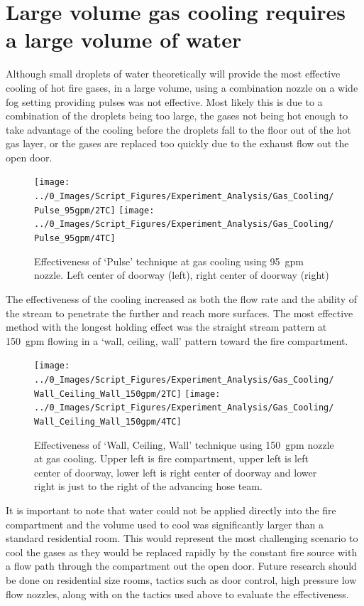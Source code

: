 \documentclass[12pt,oneside]{book}
\begin{document}
\section{Large volume gas cooling requires a large volume of water} \label{tc:large_volume_gas_cooling}
Although small droplets of water theoretically will provide the most effective cooling of hot fire gases, in a large volume, using a combination nozzle on a wide fog setting providing pulses was not effective. Most likely this is due to a combination of the droplets being too large, the gases not being hot enough to take advantage of the cooling before the droplets fall to the floor out of the hot gas layer, or the gases are replaced too quickly due to the exhaust flow out the open door.

\begin{figure}[H]
\centering
\texttt{[image: ../0\_Images/Script\_Figures/Experiment\_Analysis/Gas\_Cooling/Pulse\_95gpm/2TC]}
\texttt{[image: ../0\_Images/Script\_Figures/Experiment\_Analysis/Gas\_Cooling/Pulse\_95gpm/4TC]}
\caption[Gas Cooling Example - Pulse 95~gpm Setting]{Effectiveness of `Pulse' technique at gas cooling using 95~gpm nozzle. Left center of doorway (left), right center of doorway (right)}
\label{fig:gas_pulse_95_TC}
\end{figure}

The effectiveness of the cooling increased as both the flow rate and the ability of the stream to penetrate the further and reach more surfaces. The most effective method with the longest holding effect was the straight stream pattern at 150~gpm flowing in a `wall, ceiling, wall' pattern toward the fire compartment. 

 \begin{figure}[H]
\centering
\texttt{[image: ../0\_Images/Script\_Figures/Experiment\_Analysis/Gas\_Cooling/Wall\_Ceiling\_Wall\_150gpm/2TC]}
\texttt{[image: ../0\_Images/Script\_Figures/Experiment\_Analysis/Gas\_Cooling/Wall\_Ceiling\_Wall\_150gpm/4TC]}
\caption[Gas Cooling - Straight Stream 150~gpm]{Effectiveness of `Wall, Ceiling, Wall' technique using 150~gpm nozzle at gas cooling. Upper left is fire compartment, upper left is left center of doorway, lower left is right center of doorway and lower right is just to the right of the advancing hose team.}
\label{fig:gas_wall_ceiling_wall_150_TC}
\end{figure}

It is important to note that water could not be applied directly into the fire compartment and the volume used to cool was significantly larger than a standard residential room. This would represent the most challenging scenario to cool the gases as they would be replaced rapidly by the constant fire source with a flow path through the compartment out the open door. Future research should be done on residential size rooms, tactics such as door control, high pressure low flow nozzles, along with on the tactics used above to evaluate the effectiveness.  
\end{document}
